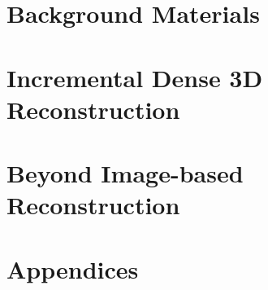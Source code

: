\documentclass[ 
                fontsize=9pt,
                oneside,
                twoside,
                openright,
                titlepage,
                dottedtoc,
                a5paper,
                fleqn,%
                headinclude,
                footinclude=true,
                BCOR=10mm,%
                DIV=12,
                numbers=noenddot,
                cleardoublepage=empty
                ]{scrbook}
\begin{document}

\cleardoublepage
\maketitle

\pagestyle{empty}

\cleardoublepage
\newpage
\newpage



\cleardoublepage
\newpage

\setcounter{page}{1}
\pagestyle{plain}




\dominitoc%
\tableofcontents
\cleardoublepage
\newpage

\setcounter{page}{1}

\cleardoublepage
\newpage

\part{Background Materials}


\part{Incremental Dense 3D Reconstruction}




\part{Beyond Image-based Reconstruction}

%


\cleardoublepage

\part{Appendices}
\appendix






\cleardoublepage
{}
{}
\small


\end{document}

